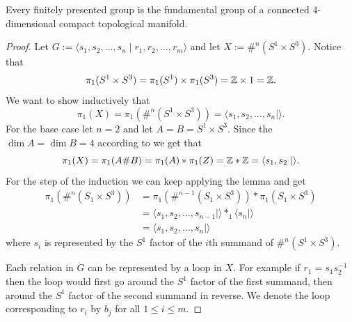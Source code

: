 \documentclass[11pt,a4paper]{article}
\begin{document}
\begin{theorem}
  Every finitely presented group is the fundamental group of a connected
  $4$-dimensional compact topological manifold.
\end{theorem}
\begin{proof}
  Let $G := \langle s_1,s_2,\dots,s_n \mid r_1,r_2,\dots,r_m \rangle$
  and let $X := \#^n (S^1 \times S^3)$.
  Notice that
  \[
    \pi_1(S^1 \times S^3) =
    \pi_1(S^1) \times \pi_1(S^3) =
    \mathbb{Z} \times 1 = \mathbb{Z}.
  \]
  We want to show inductively that
  \[
    \pi_1(X) =
    \pi_1(\#^n (S^1 \times S^3)) =
    \langle s_1,s_2,\dots,s_n \mid \rangle.
  \]
  For the base case let $n = 2$
  and let $A = B = S^1 \times S^3$.
  Since the $\dim A = \dim B = 4$ according to
  we get that
  \[
    \pi_1(X) =
    \pi_1(A \# B) =
    \pi_1(A) * \pi_1(Z) =
    \mathbb{Z} * \mathbb{Z} =
    \langle s_1,s_2 \mid \rangle.
  \]
  For the step of the induction we can keep applying the lemma and get
  \begin{align*}
    \pi_1(\#^n (S_1 \times S^3)) &=
    \pi_1(\#^{n-1} (S_1 \times S^3)) * \pi_1(S_1 \times S^3) \\ &=
    \langle s_1,s_2,\dots,s_{n-1} \mid \rangle *_{1} \langle s_n \mid \rangle
                                                             \\ &=
    \langle s_1,s_2,\dots,s_{n} \mid \rangle
  \end{align*}
  where $s_i$ is represented by the $S^1$ factor of the $i$th summand of
  $\#^n (S^1 \times S^3)$.

  Each relation in $G$ can be represented by a loop in $X$.
  For example if $r_1 = s_1 s_2^{-1}$ then the loop would first
  go around the $S^1$ factor of the first summand, then
  around the $S^1$ factor of the second summand in reverse.
  We denote the loop corresponding to $r_i$ by $b_j$
  for all $1 \le i \le m$.


\end{proof}
\end{document}
